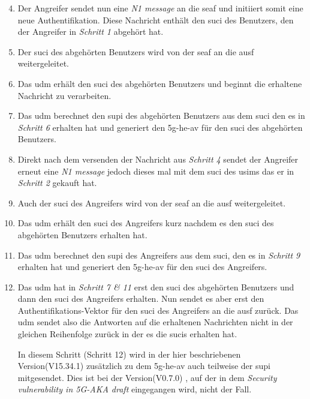 \begin{enumerate}
\setcounter{enumi}{3}

\item Der Angreifer sendet nun eine \textit{N1 message} an die \gls{seaf} und initiiert somit eine neue Authentifikation.
Diese Nachricht enthält den \gls{suci} des Benutzers, den der Angreifer in \textit{Schritt 1} abgehört hat.

\item Der \gls{suci} des abgehörten Benutzers wird von der \gls{seaf} an die \gls{ausf} weitergeleitet.

\item Das \gls{udm} erhält den \gls{suci} des abgehörten Benutzers und beginnt die erhaltene Nachricht zu verarbeiten.

\item Das \gls{udm} berechnet den \gls{supi} des abgehörten Benutzers aus dem \gls{suci} den es in \textit{Schritt 6} erhalten hat und generiert den \gls{5g-he-av} für den \gls{suci} des abgehörten Benutzers.

\item Direkt nach dem versenden der Nachricht aus \textit{Schritt 4} sendet der Angreifer erneut eine \textit{N1 message} jedoch dieses mal mit dem \gls{suci} des \gls{usim}s das er in \textit{Schritt 2} gekauft hat.

\item Auch der \gls{suci} des Angreifers wird von der \gls{seaf} an die \gls{ausf} weitergeleitet.

\item Das \gls{udm} erhält den \gls{suci} des Angreifers kurz nachdem es den \gls{suci} des abgehörten Benutzers erhalten hat.

\item Das \gls{udm} berechnet den \gls{supi} des Angreifers aus dem \gls{suci}, den es in \textit{Schritt 9} erhalten hat und generiert den \gls{5g-he-av} für den \gls{suci} des Angreifers.

\item Das \gls{udm} hat in \textit{Schritt 7 \& 11} erst den \gls{suci} des abgehörten Benutzers und dann den \gls{suci} des Angreifers erhalten.
Nun sendet es aber erst den Authentifikations-Vektor für den \gls{suci} des Angreifers an die \gls{ausf} zurück.
Das \gls{udm} sendet also die Antworten auf die erhaltenen Nachrichten nicht in der gleichen Reihenfolge zurück in der es die \gls{suci}s erhalten hat.

In diesem Schritt (Schritt 12) wird in der hier beschriebenen Version(V15.34.1) \cite{3gppTS33.501V15.34.1} zusätzlich zu dem \gls{5g-he-av} auch teilweise der \gls{supi} mitgesendet.
Dies ist bei der Version(V0.7.0) \cite{3gppTS33.501V0.7.0}, auf der in dem \textit{Security vulnerability in 5G-AKA draft} eingegangen wird, nicht der Fall.


\end{enumerate}
